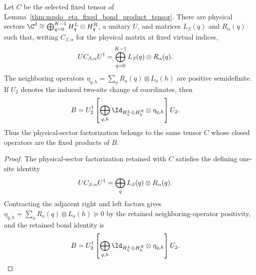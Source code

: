 \begin{lemma}
    \label{thm:mpdo_fixed_bond_positive_physical_sector_representative}
    \leanok
    Let $C$ be the selected fixed tensor of
    Lemma~\ref{thm:mpdo_eta_fixed_bond_product_tensor}. There are
    physical sectors
    $\C^d\cong\bigoplus_{q=0}^{K-1}H_q^L\otimes H_q^R$,
    a unitary $U$, and matrices $L_\beta(q)$ and $R_\alpha(q)$ such that,
    writing $C_{\beta,\alpha}$ for the physical matrix at fixed virtual
    indices,
    \begin{align}
        U C_{\beta,\alpha}U^\dagger
         & =
        \bigoplus_{q=0}^{K-1}
        L_\beta(q)\otimes R_\alpha(q).
        \notag
    \end{align}
    The neighboring operators
    $\eta_{q,h}=\sum_a R_a(q)\otimes L_a(h)$
    are positive semidefinite. If $U_2$ denotes the induced two-site change
    of coordinates, then
    \begin{align}
        B
         & =
        U_2^\dagger
        \left[\bigoplus_{q,h}
            \Id_{H_q^L\otimes H_h^R}\otimes\eta_{q,h}\right]
        U_2.
        \notag
    \end{align}
    Thus the physical-sector factorization belongs to the same tensor $C$
    whose closed operators are the fixed products of $B$.
\end{lemma}

\begin{proof}\leanok
    The physical-sector factorization retained with $C$ satisfies the defining
    one-site identity
    \begin{align}
        U C_{\beta,\alpha}U^\dagger
         & =
        \bigoplus_q L_\beta(q)\otimes R_\alpha(q).
        \notag
    \end{align}
    Contracting the adjacent right and left factors gives
    $\eta_{q,h}=\sum_a R_a(q)\otimes L_a(h)\succeq0$ by the retained
    neighboring-operator positivity, and the retained bond identity is
    \begin{align}
        B
         & =
        U_2^\dagger
        \left[\bigoplus_{q,h}
            \Id_{H_q^L\otimes H_h^R}\otimes\eta_{q,h}\right]
        U_2.
        \notag
    \end{align}
\end{proof}

